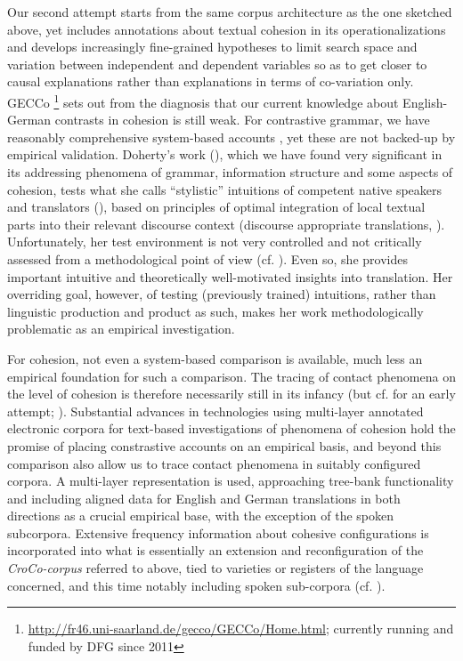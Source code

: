 \documentclass[output=paper]{LSP/langsci}
\begin{document}
Our second attempt starts from the same corpus architecture as the one sketched above, yet includes annotations about textual cohesion in its operationalizations and develops increasingly fine-grained hypotheses to limit search space and variation between independent and dependent variables so as to get closer to causal explanations rather than explanations in terms of co-variation only. GECCo \footnote{\url{http://fr46.uni-saarland.de/gecco/GECCo/Home.html}; currently running and funded by DFG since 2011} sets out from the diagnosis that our current knowledge about English-German contrasts in cohesion is still weak. For contrastive grammar, we have reasonably comprehensive system-based accounts \citep{Hawkins1986,König2007}, yet these are not backed-up by empirical validation. Doherty's work (\citeyear{Doherty2002,Doherty2006}), which we have found very significant in its addressing phenomena of grammar, information structure and some aspects of cohesion, tests what she calls ``stylistic'' intuitions of competent native speakers and translators (\citeyear[11]{Doherty2002}), based on principles of optimal integration of local textual parts into their relevant discourse context (discourse appropriate translations, \citealt[1ff]{Doherty2006}). Unfortunately, her test environment is not very controlled and not critically assessed from a methodological point of view (cf. \citealt[ix]{Doherty2006}). Even so, she provides important intuitive and theoretically well-motivated insights into translation. Her overriding goal, however, of testing (previously trained) intuitions, rather than linguistic production and product as such, makes her work methodologically problematic as an empirical investigation. 

For cohesion, not even a system-based comparison is available, much less an empirical foundation for such a comparison. The tracing of contact phenomena on the level of cohesion is therefore necessarily still in its infancy (but cf. \citealt{Hansen-SchirraEtAl2007} for an early attempt; \citealt[a,b]{Kunzfc}). Substantial advances in technologies using multi-layer annotated electronic corpora for text-based investigations of phenomena of cohesion hold the promise of placing constrastive accounts on an empirical basis, and beyond this comparison also allow us to trace contact phenomena in suitably configured corpora. A multi-layer representation is used, approaching tree-bank functionality and including aligned data for English and German translations in both directions as a crucial empirical base, with the exception of the spoken subcorpora. Extensive frequency information about cohesive configurations is incorporated into what is essentially an extension and reconfiguration of the \textit{CroCo-corpus} referred to above, tied to varieties or registers of the language concerned, and this time notably including spoken sub-corpora (cf. ). 
\end{document}
